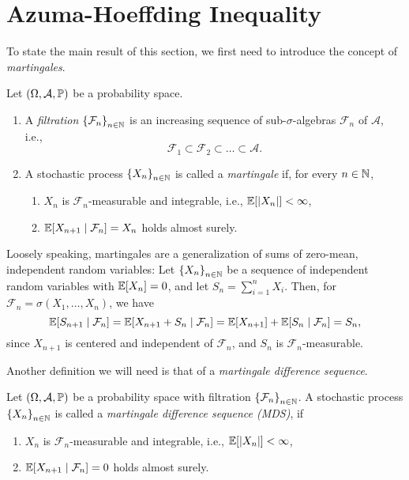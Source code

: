 \section{Azuma-Hoeffding Inequality}

To state the main result of this section, we first need to introduce the concept of \emph{martingales}.

\begin{definition}
Let $(\Omega, \mathcal{A}, \P)$ be a probability space.
\begin{enumerate}
    \item A \emph{filtration} $\set{\mathcal{F}_n}_{n \in \N}$ is an increasing sequence of sub-$\sigma$-algebras $\mathcal{F}_n$ of $\mathcal{A}$, i.e.,
    \[
        \mathcal{F}_1 \subset \mathcal{F}_2 \subset \dots \subset \mathcal{A}.
    \]

    \item A stochastic process $\set{X_n}_{n \in \N}$ is called a \emph{martingale} if, for every $n \in \N$,
    \begin{enumerate}
        \item $X_n$ is $\mathcal{F}_n$-measurable and integrable, i.e., $\Exp[\abs{X_n}] < \infty$,

        \item $\Exp[X_{n+1} \given \mathcal{F}_n] = X_n$ holds almost surely.
    \end{enumerate}
\end{enumerate}
\end{definition}

Loosely speaking, martingales are a generalization of sums of zero-mean, independent random variables: Let $\set{X_n}_{n \in \N}$ be a sequence of independent random variables with $\Exp[X_n] = 0$, and let $S_n = \sum_{i=1}^n X_i$. Then, for $\mathcal{F}_n = \sigma(X_1, \dots, X_n)$, we have
\[
    \Exp[S_{n+1} \given \mathcal{F}_n] = \Exp[X_{n+1} + S_n \given \mathcal{F}_n] = \Exp[X_{n+1}] + \Exp[S_n \given \mathcal{F}_n] = S_n,
\]
since $X_{n+1}$ is centered and independent of $\mathcal{F}_n$, and $S_n$ is $\mathcal{F}_n$-measurable.

Another definition we will need is that of a \emph{martingale difference sequence}.

\begin{definition}
Let $(\Omega, \mathcal{A}, \P)$ be a probability space with filtration $\set{\mathcal{F}_n}_{n \in \N}$. A stochastic process $\set{X_n}_{n \in \N}$ is called a \emph{martingale difference sequence (MDS)}, if
\begin{enumerate}
    \item $X_n$ is $\mathcal{F}_n$-measurable and integrable, i.e., $\Exp[\abs{X_n}] < \infty$,

    \item $\Exp[X_{n+1} \given \mathcal{F}_n] = 0$ holds almost surely.
\end{enumerate}
\end{definition}

